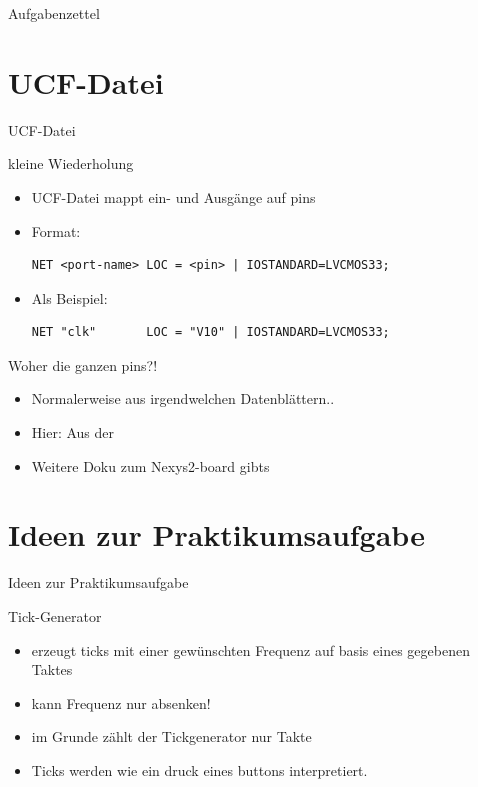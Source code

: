 \documentclass[aspectratio=169,presentation]{beamer}
\newcommand{\sectionframe}[1]{
	\begin{frame}
		\vfill
		\Huge
		\centering
		\usebeamercolor[fg]{title}
		#1
		\vfill
		\par
	\end{frame}
}
\begin{document}
\sectionframe{Aufgabenzettel}

\section{UCF-Datei}
\sectionframe{UCF-Datei}
\begin{frame} [fragile] {kleine Wiederholung}
	\begin{itemize}
		\item UCF-Datei mappt ein- und Ausgänge auf pins
		\item Format:
		\begin{lstlisting}
NET <port-name> LOC = <pin> | IOSTANDARD=LVCMOS33;
		\end{lstlisting}
		\item Als Beispiel:
		\begin{lstlisting}
NET "clk"		LOC = "V10" | IOSTANDARD=LVCMOS33;
		\end{lstlisting}
	\end{itemize}
\end{frame}

\begin{frame} [fragile] {Woher die ganzen pins?!}
	\begin{itemize}
		\item Normalerweise aus irgendwelchen Datenblättern..
		\item Hier: Aus der 
		\href{https://users.informatik.haw-hamburg.de/~behn/pub/CEP/FPGA_CE Board.pdf}{}
		\item Weitere Doku zum Nexys2-board gibts \href{http://users.informatik.haw-hamburg.de/~schafers/LOCAL/S19S_CE/DOCU/OLD Digilent Nexys2 Board Reference Manual.pdf}{\color{red}{HIER}}
	\end{itemize}
\end{frame}


\section{Ideen zur Praktikumsaufgabe}
\sectionframe{Ideen zur Praktikumsaufgabe}
\begin{frame} {Tick-Generator}
	\begin{itemize}
		\item erzeugt ticks mit einer gewünschten Frequenz auf basis eines gegebenen Taktes
		\item kann Frequenz nur absenken!
		\item im Grunde zählt der Tickgenerator nur Takte\\
		\item Ticks werden wie ein druck eines buttons interpretiert.
	\end{itemize}
\end{frame}
\end{document}
